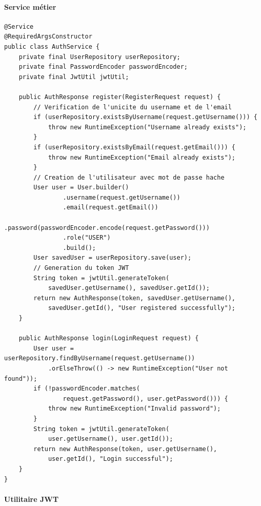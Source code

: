 \documentclass[12pt,a4paper]{article}
\begin{document}
\paragraph{Service métier}

\begin{lstlisting}[style=javastyle, caption={AuthService.java --- Logique métier d'authentification}, label=lst:authsvc]
@Service
@RequiredArgsConstructor
public class AuthService {
    private final UserRepository userRepository;
    private final PasswordEncoder passwordEncoder;
    private final JwtUtil jwtUtil;

    public AuthResponse register(RegisterRequest request) {
        // Verification de l'unicite du username et de l'email
        if (userRepository.existsByUsername(request.getUsername())) {
            throw new RuntimeException("Username already exists");
        }
        if (userRepository.existsByEmail(request.getEmail())) {
            throw new RuntimeException("Email already exists");
        }
        // Creation de l'utilisateur avec mot de passe hache
        User user = User.builder()
                .username(request.getUsername())
                .email(request.getEmail())
                .password(passwordEncoder.encode(request.getPassword()))
                .role("USER")
                .build();
        User savedUser = userRepository.save(user);
        // Generation du token JWT
        String token = jwtUtil.generateToken(
            savedUser.getUsername(), savedUser.getId());
        return new AuthResponse(token, savedUser.getUsername(),
            savedUser.getId(), "User registered successfully");
    }

    public AuthResponse login(LoginRequest request) {
        User user = userRepository.findByUsername(request.getUsername())
            .orElseThrow(() -> new RuntimeException("User not found"));
        if (!passwordEncoder.matches(
                request.getPassword(), user.getPassword())) {
            throw new RuntimeException("Invalid password");
        }
        String token = jwtUtil.generateToken(
            user.getUsername(), user.getId());
        return new AuthResponse(token, user.getUsername(),
            user.getId(), "Login successful");
    }
}
\end{lstlisting}

\paragraph{Utilitaire JWT}
\end{document}
